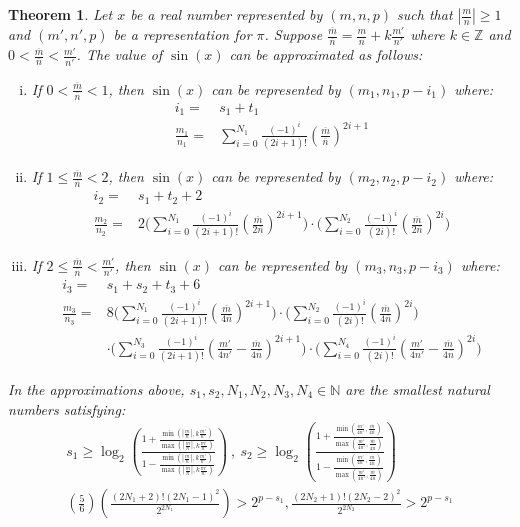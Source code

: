 \documentclass{article}
\newcommand{\nat}{\mathbb{N}}
\newcommand{\integer}{\mathbb{Z}}
\newcommand{\om}{\overline{m}}
\newcommand{\on}{\overline{n}}
\newtheorem{mytheorem}{Theorem}
\numberwithin{mytheorem}{section}
\newcommand{\taylorsin}[3] {\sum_{i=#1}^{#2}\frac{(-1)^i}{(2i+1)!}{#3}^{2i+1}}
\newcommand{\taylorcos}[3] {\sum_{i=#1}^{#2}\frac{(-1)^i}{(2i)!}{#3}^{2i}}
\begin{document}
\begin{mytheorem}\label{thm:extend_sin}
Let $x$ be a real number represented by $(m,n,p)$ such that $|\frac{m}{n}|\geq 1$ and $(m',n',p)$ be a representation for $\pi$. Suppose $\frac{\om}{\on}=\frac{m}{n}+k\frac{m'}{n'}$ where $k\in\integer$ and $0<\frac{\om}{\on}<\frac{m'}{n'}$. The value of $\sin(x)$ can be approximated as follows:
\begin{enumerate}[i.]
\item \label{thm:extend_sin_1}
If $0<\frac{\om}{\on}<1$, then $\sin(x)$ can be represented by $(m_1,n_1,p-i_1)$ where:
\begin{align*}
i_1=&s_1+t_1\\
\frac{m_1}{n_1}=&\taylorsin{0}{N_1}{(\frac{\om}{\on})}
\end{align*}
\item \label{thm:extend_sin_2}
If $1\leq \frac{\om}{\on}<2$, then $\sin(x)$ can be represented by $(m_2,n_2,p-i_2)$ where:
\begin{align*}
i_2=&s_1+t_2+2\\
\frac{m_2}{n_2}=&2\bigg(\taylorsin{0}{N_1}{(\frac{\om}{2\on})}\bigg)\cdot\bigg(\taylorcos{0}{N_2}{(\frac{\om}{2\on})}\bigg)
\end{align*}
\item \label{thm:extend_sin_3}
If $2\leq \frac{\om}{\on}<\frac{m'}{n'}$, then $\sin(x)$ can be represented by $(m_3,n_3,p-i_3)$ where:
\begin{align*}
i_3=&s_1+s_2+t_3+6\\
\frac{m_3}{n_3}=&8\bigg(\taylorsin{0}{N_1}{(\frac{\om}{4\on})}\bigg)\cdot\bigg(\taylorcos{0}{N_2}{(\frac{\om}{4\on})}\bigg)\\
& \cdot\bigg(\taylorsin{0}{N_3}{(\frac{m'}{4n'}-\frac{\om}{4\on})}\bigg)\cdot\bigg(\taylorcos{0}{N_4}{(\frac{m'}{4n'}-\frac{\om}{4\on})}\bigg)
\end{align*}
\end{enumerate}
In the approximations above, $s_1,s_2,N_1,N_2,N_3,N_4\in \nat$ are the smallest natural numbers satisfying:
\begin{gather*}
s_1\geq \log_2(\frac{1+\frac{\min(|\frac{m}{n}|,k\frac{m'}{n'})}{\max(|\frac{m}{n}|,k\frac{m'}{n'})}}{1-\frac{\min(|\frac{m}{n}|,k\frac{m'}{n'})}{\max(|\frac{m}{n}|,k\frac{m'}{n'})}}) ~,~s_2\geq \log_2(\frac{1+\frac{\min(\frac{m'}{4n'},\frac{\om}{4\on})}{\max(\frac{m'}{4n'},\frac{\om}{4\on})}}{1-\frac{\min(\frac{m'}{4n'},\frac{\om}{4\on})}{\max(\frac{m'}{4n'},\frac{\om}{4\on})}})\\
(\frac{5}{6})(\frac{(2N_1+2)!(2N_1-1)^2}{2^{2N_1}})>2^{p-s_1} ,\frac{(2N_2+1)!(2N_2-2)^2}{2^{2N_2}}>2^{p-s_1}\\

\end{gather*}
\end{mytheorem}
\end{document}
